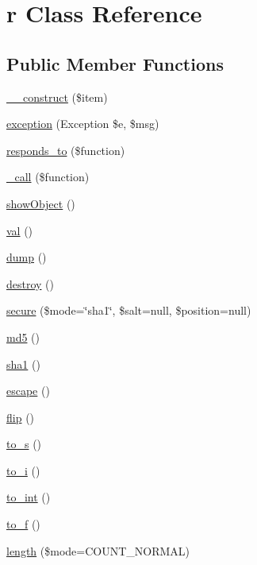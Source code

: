 \hypertarget{classr}{\section{r Class Reference}
\label{classr}
}
\subsection*{Public Member Functions}
\begin{DoxyCompactItemize}
\item 
\hyperlink{classr_a4b0c1fe0e6c94ec2df5006f414b164c4}{\-\_\-\-\_\-construct} (\$item)
\item 
\hyperlink{classr_ac53bb6cc3dad129127779798eb479903}{exception} (Exception \$e, \$msg)
\item 
\hyperlink{classr_ae9afa34c455aa79da5394a608f38386e}{responds\-\_\-to} (\$function)
\item 
\hyperlink{classr_af4b09312c3dd2b7ef02781c54c9a5244}{\-\_\-call} (\$function)
\item 
\hyperlink{classr_a152d588244df6a865c3f452d7b095a42}{show\-Object} ()
\item 
\hyperlink{classr_af745c1e6bc71ed38a120043c0cb13416}{val} ()
\item 
\hyperlink{classr_a5bf63e4ac70cfd9d97e3f2eab936ec8b}{dump} ()
\item 
\hyperlink{classr_aa118461de946085fe42989193337044a}{destroy} ()
\item 
\hyperlink{classr_a983a9fa784e9028dea46897a760f1210}{secure} (\$mode=\char`\"{}sha1\char`\"{}, \$salt=null, \$position=null)
\item 
\hyperlink{classr_a63b637e71bf8bbee33889ae833423560}{md5} ()
\item 
\hyperlink{classr_a7751a3691d09eba1c3d390fdde2c4f4f}{sha1} ()
\item 
\hyperlink{classr_ab4e6060d5b0dd93113194ba83534d385}{escape} ()
\item 
\hyperlink{classr_ab7b978294481794664ea5ffa6530e020}{flip} ()
\item 
\hyperlink{classr_a4968be1bfca5da3a210d46e21bd080ff}{to\-\_\-s} ()
\item 
\hyperlink{classr_aa1ea52bbf266b7ba98c1198ca335ddf1}{to\-\_\-i} ()
\item 
\hyperlink{classr_a2d59e8b9284086c0dd59203615f28d2e}{to\-\_\-int} ()
\item 
\hyperlink{classr_ad12032cdf12c784eafa8994f13f464df}{to\-\_\-f} ()
\item 
\hyperlink{classr_a93564c0bb378f8d37470946df4d09ceb}{length} (\$mode=C\-O\-U\-N\-T\-\_\-\-N\-O\-R\-M\-A\-L)

\end{DoxyCompactItemize}
